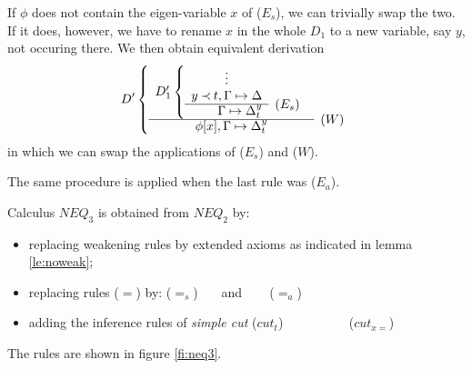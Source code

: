 \begin{PROOF}
\begin{LS}
If $\phi$ does not contain the eigen-variable $x$ of ($E_s$), we can
trivially swap the two. If it does, however, we have to rename $x$ in the
whole $D_1$ to a new variable, say $y$, not occuring there. We then obtain
equivalent derivation 
\[ D' \left \{ \begin{array}{cl}
 D_1' \left \{ \begin{array}{rl}
 \multicolumn{1}{c}{\vdots} \\
 y\Incl t,  \GSD \\ \cline{1-1}
  \GSD_t^y & \rabove{(E_s)} \end{array} \right . \\ \cline{1-1}
 \phi[x], \GSD_t^y & \rabove{(W)} \end{array} \right . \]
in which we can swap the applications of ($E_s$) and ($W$). \\
\item The same procedure is applied when the last rule was ($E_a$).
\end{LS}
\end{PROOF}


\begin{DEFINITION} Calculus $NEQ_3$ is obtained from $NEQ_2$ by:
\begin{itemize}\MyLPar
\item replacing weakening rules by extended axioms as indicated in lemma \ref{le:noweak};
\item replacing rules  ($=$) by:
 ($=_{s}$)
\label{ru:K12s} \ \ \ 
and \ \ \ 
 ($=_{a}$)
\label{ru:K12a} 
\item adding the inference rules of {\em simple cut}
 ($cut_t$)\label{ru:sicut}
\ \ \ \ \ \ \ \ \ 
 ($cut_{x=}$)\label{ru:cutxeq}
\end{itemize}
\end{DEFINITION}
\noindent
The rules are shown in figure \ref{fi:neq3}.

